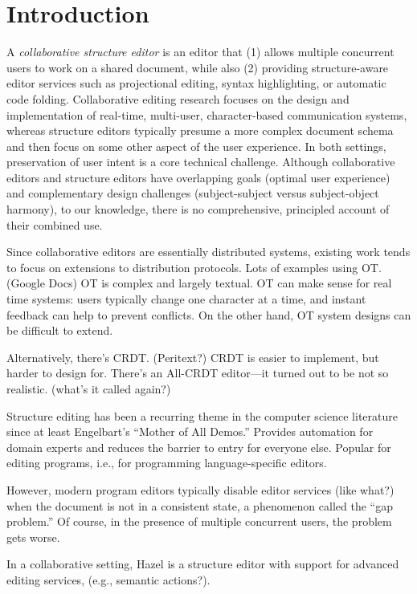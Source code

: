 
\section{Introduction}%
\label{sec:Introduction}

A \emph{collaborative structure editor} is an editor that
(1) allows multiple concurrent users to work on a shared document, while also
(2) providing structure-aware editor services such as projectional editing, syntax highlighting, or automatic code folding.
%
Collaborative editing research focuses on the design and implementation of real-time, multi-user, character-based communication systems,
whereas structure editors typically presume a more complex document schema and then focus on some other aspect of the user experience.
In both settings, preservation of user intent is a core technical challenge.
%
Although collaborative editors and structure editors have overlapping goals (optimal user experience)
and complementary design challenges (subject-subject versus subject-object harmony),
to our knowledge, there is no comprehensive, principled account of their combined use.

Since collaborative editors are essentially distributed systems, existing work tends to focus on extensions to distribution protocols.
Lots of examples using OT. (Google Docs)
OT is complex and largely textual.
OT can make sense for real time systems: users typically change one character at a time, and instant feedback can help to prevent conflicts.
On the other hand, OT system designs can be difficult to extend.

Alternatively, there's CRDT. (Peritext?)
CRDT is easier to implement, but harder to design for.
There's an All-CRDT editor---it turned out to be not so realistic. (what's it called again?)

Structure editing has been a recurring theme in the computer science literature since at least Engelbart's ``Mother of All Demos.''
Provides automation for domain experts and reduces the barrier to entry for everyone else.
Popular for editing programs, i.e., for programming language-specific editors.

However, modern program editors typically disable editor services (like what?) when the document is not in a consistent state,
a phenomenon called the ``gap problem.''
Of course, in the presence of multiple concurrent users, the problem gets worse.

In a collaborative setting,
Hazel is a structure editor with support for advanced editing services, (e.g., semantic actions?).

